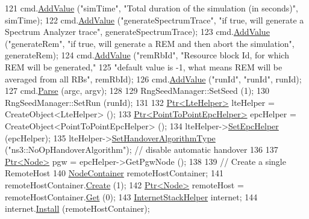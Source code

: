 \begin{DoxyCode}
121   cmd.\hyperlink{classns3_1_1CommandLine_addcfb546c7ad4c8bd0965654d55beb8e}{AddValue} (\textcolor{stringliteral}{"simTime"}, \textcolor{stringliteral}{"Total duration of the simulation (in seconds)"}, simTime);
122   cmd.\hyperlink{classns3_1_1CommandLine_addcfb546c7ad4c8bd0965654d55beb8e}{AddValue} (\textcolor{stringliteral}{"generateSpectrumTrace"}, \textcolor{stringliteral}{"if true, will generate a Spectrum Analyzer trace"}, 
      generateSpectrumTrace);
123   cmd.\hyperlink{classns3_1_1CommandLine_addcfb546c7ad4c8bd0965654d55beb8e}{AddValue} (\textcolor{stringliteral}{"generateRem"}, \textcolor{stringliteral}{"if true, will generate a REM and then abort the simulation"}, 
      generateRem);
124   cmd.\hyperlink{classns3_1_1CommandLine_addcfb546c7ad4c8bd0965654d55beb8e}{AddValue} (\textcolor{stringliteral}{"remRbId"}, \textcolor{stringliteral}{"Resource block Id, for which REM will be generated,"}
125                 \textcolor{stringliteral}{"default value is -1, what means REM will be averaged from all RBs"}, remRbId);
126   cmd.\hyperlink{classns3_1_1CommandLine_addcfb546c7ad4c8bd0965654d55beb8e}{AddValue} (\textcolor{stringliteral}{"runId"}, \textcolor{stringliteral}{"runId"}, runId);
127   cmd.\hyperlink{classns3_1_1CommandLine_a5c10b85b3207e5ecb48d907966923156}{Parse} (argc, argv);
128 
129   RngSeedManager::SetSeed (1);
130   RngSeedManager::SetRun (runId);
131 
132   \hyperlink{classns3_1_1Ptr}{Ptr<LteHelper>} lteHelper = CreateObject<LteHelper> ();
133   \hyperlink{classns3_1_1Ptr}{Ptr<PointToPointEpcHelper>} epcHelper = CreateObject<PointToPointEpcHelper> ();
134   lteHelper->\hyperlink{classns3_1_1LteHelper_a324079a1ccd54ce949786b83d6b95915}{SetEpcHelper} (epcHelper);
135   lteHelper->\hyperlink{classns3_1_1LteHelper_a6301630b8a7082043efff2a7aaaa1d20}{SetHandoverAlgorithmType} (\textcolor{stringliteral}{"ns3::NoOpHandoverAlgorithm"}); \textcolor{comment}{// disable
       automatic handover}
136 
137   \hyperlink{classns3_1_1Ptr}{Ptr<Node>} pgw = epcHelper->GetPgwNode ();
138 
139   \textcolor{comment}{// Create a single RemoteHost}
140   \hyperlink{classns3_1_1NodeContainer}{NodeContainer} remoteHostContainer;
141   remoteHostContainer.\hyperlink{classns3_1_1NodeContainer_a787f059e2813e8b951cc6914d11dfe69}{Create} (1);
142   \hyperlink{classns3_1_1Ptr}{Ptr<Node>} remoteHost = remoteHostContainer.\hyperlink{classns3_1_1NodeContainer_a9ed96e2ecc22e0f5a3d4842eb9bf90bf}{Get} (0);
143   \hyperlink{classns3_1_1InternetStackHelper}{InternetStackHelper} internet;
144   internet.\hyperlink{classns3_1_1InternetStackHelper_a6645b412f31283d2d9bc3d8a95cebbc0}{Install} (remoteHostContainer);

\end{DoxyCode}
